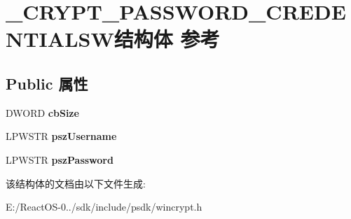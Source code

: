 \hypertarget{struct___c_r_y_p_t___p_a_s_s_w_o_r_d___c_r_e_d_e_n_t_i_a_l_s_w}{}\section{\+\_\+\+C\+R\+Y\+P\+T\+\_\+\+P\+A\+S\+S\+W\+O\+R\+D\+\_\+\+C\+R\+E\+D\+E\+N\+T\+I\+A\+L\+S\+W结构体 参考}
\label{struct___c_r_y_p_t___p_a_s_s_w_o_r_d___c_r_e_d_e_n_t_i_a_l_s_w}
\subsection*{Public 属性}
\begin{DoxyCompactItemize}
\item 
\mbox{\label{struct___c_r_y_p_t___p_a_s_s_w_o_r_d___c_r_e_d_e_n_t_i_a_l_s_w_a21964196744dbde36cf5844c9eb5a89e}} 
D\+W\+O\+RD {\bfseries cb\+Size}
\item 
\mbox{\label{struct___c_r_y_p_t___p_a_s_s_w_o_r_d___c_r_e_d_e_n_t_i_a_l_s_w_aea20d75a0699fd62ff845591d0833f5c}} 
L\+P\+W\+S\+TR {\bfseries psz\+Username}
\item 
\mbox{\label{struct___c_r_y_p_t___p_a_s_s_w_o_r_d___c_r_e_d_e_n_t_i_a_l_s_w_abe7272fd0a719a7dcf9134593863d581}} 
L\+P\+W\+S\+TR {\bfseries psz\+Password}
\end{DoxyCompactItemize}


该结构体的文档由以下文件生成\+:\begin{DoxyCompactItemize}
\item 
E\+:/\+React\+O\+S-\/0../sdk/include/psdk/wincrypt.\+h\end{DoxyCompactItemize}

